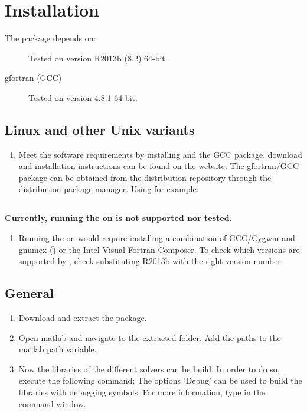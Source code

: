 \chapter[Installation]{Installation}
The \PPODESUITE package depends on:
\begin{description}
  \item[\MATLAB] Tested on \MATLAB version R2013b (8.2) 64-bit.
  \item[gfortran (GCC)] Tested on version 4.8.1 64-bit.
\end{description}

\section[\nix]{Linux and other Unix variants}
\begin{enumerate}
 \item Meet the software requirements by installing \MATLAB and the GCC package. \MATLAB download and installation instructions can be found on the \MATHWORKS website. The gfortran/GCC package can be obtained from the \nix distribution repository through the distribution package manager. Using \UBUNTU for example:
\end{enumerate}

\section[Windows]{\MSDOS}
\textbf{Currently, running the \PPODESUITE on \MSDOS is not supported nor tested.}
\begin{enumerate}
 \item Running the \PPODESUITE on \MSDOS would require installing a combination of GCC/Cygwin and gnumex (\hyperlink{http://gnumex.sourceforge.net/}) or the Intel Visual Fortran Composer. To check which versions are supported by \MATLAB, check \hyperlink{http://www.mathworks.nl/support/compilers/R2013b/} substituting R2013b with the right version number.
\end{enumerate}

\section{General}
\begin{enumerate}[resume]
 \item Download and extract the \PPODESUITE package.
 \item Open matlab and navigate to the extracted \PPODESUITE folder. Add the \PPODE paths to the matlab path variable.
 \item Now the libraries of the different solvers can be build. In order to do so, execute the following command;
 The options 'Debug' can be used to build the libraries with debugging symbols.
 For more information, type  in the \MATLAB command window.
\end{enumerate}
